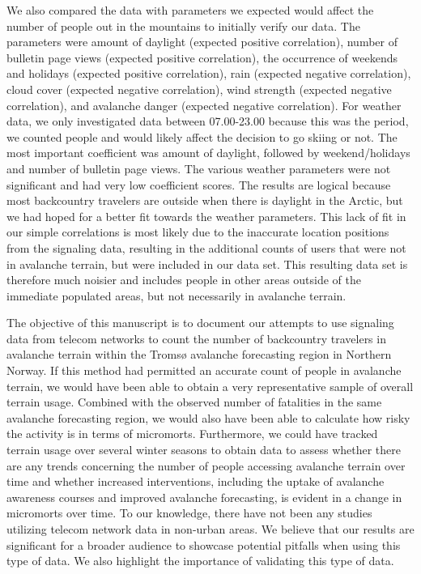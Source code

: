 \documentclass[authordate,empirical]{jote-new-article}
\begin{document}
We also compared the data with parameters we expected would affect the number of people out in the mountains to initially verify our data. The parameters were amount of daylight (expected positive correlation), number of bulletin page views (expected positive correlation), the occurrence of weekends and holidays (expected positive correlation), rain (expected negative correlation), cloud cover (expected negative correlation), wind strength (expected negative correlation), and avalanche danger (expected negative correlation). For weather data, we only investigated data between 07.00-23.00 because this was the period, we counted people and would likely affect the decision to go skiing or not. The most important coefficient was amount of daylight, followed by weekend/holidays and number of bulletin page views. The various weather parameters were not significant and had very low coefficient scores. The results are logical because most backcountry travelers are outside when there is daylight in the Arctic, but we had hoped for a better fit towards the weather parameters. This lack of fit in our simple correlations is most likely due to the inaccurate location positions from the signaling data, resulting in the additional counts of users that were not in avalanche terrain, but were included in our data set. This resulting data set is therefore much noisier and includes people in other areas outside of the immediate populated areas, but not necessarily in avalanche terrain.




\begin{originalPurpose}

  The objective of this manuscript is to document our attempts to use signaling data from telecom networks to count the number of backcountry travelers in avalanche terrain within the Tromsø avalanche forecasting region in Northern Norway. If this method had permitted an accurate count of people in avalanche terrain, we would have been able to obtain a very representative sample of overall terrain usage. Combined with the observed number of fatalities in the same avalanche forecasting region, we would also have been able to calculate how risky the activity is in terms of micromorts. Furthermore, we could have tracked terrain usage over several winter seasons to obtain data to assess whether there are any trends concerning the number of people accessing avalanche terrain over time and whether increased interventions, including the uptake of avalanche awareness courses and improved avalanche forecasting, is evident in a change in micromorts over time. To our knowledge, there have not been any studies utilizing telecom network data in non-urban areas. We believe that our results are significant for a broader audience to showcase potential pitfalls when using this type of data. We also highlight the importance of validating this type of data.




\end{originalPurpose}
\end{document}
